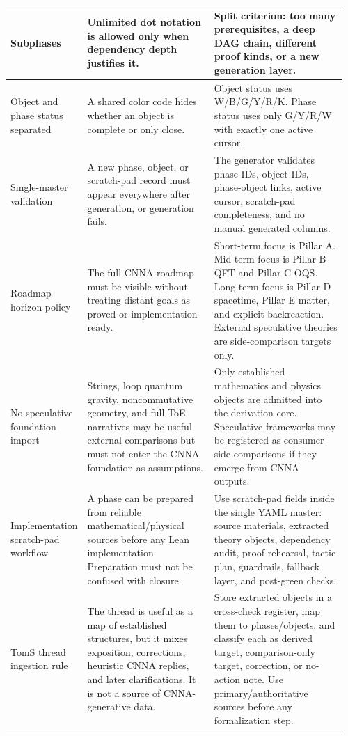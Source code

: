 \begin{longtable}{L{0.18\linewidth} L{0.38\linewidth} L{0.4\linewidth}}
\hline
\addlinespace[0.24em]
Subphases & Unlimited dot notation is allowed only when dependency depth justifies it. & Split criterion: too many prerequisites, a deep DAG chain, different proof kinds, or a new generation layer.\\
\hline
\addlinespace[0.24em]
Object and phase status separated & A shared color code hides whether an object is complete or only close. & Object status uses W/\allowbreak{}B/\allowbreak{}G/\allowbreak{}Y/\allowbreak{}R/\allowbreak{}K. Phase status uses only G/\allowbreak{}Y/\allowbreak{}R/\allowbreak{}W with exactly one active cursor.\\
\hline
\addlinespace[0.24em]
Single-master validation & A new phase, object, or scratch-pad record must appear everywhere after generation, or generation fails. & The generator validates phase IDs, object IDs, phase-object links, active cursor, scratch-pad completeness, and no manual generated columns.\\
\hline
\addlinespace[0.24em]
Roadmap horizon policy & The full CNNA roadmap must be visible without treating distant goals as proved or implementation-ready. & Short-term focus is Pillar A. Mid-term focus is Pillar B QFT and Pillar C OQS. Long-term focus is Pillar D spacetime, Pillar E matter, and explicit backreaction. External speculative theories are side-comparison targets only.\\
\hline
\addlinespace[0.24em]
No speculative foundation import & Strings, loop quantum gravity, noncommutative geometry, and full ToE narratives may be useful external comparisons but must not enter the CNNA foundation as assumptions. & Only established mathematics and physics objects are admitted into the derivation core. Speculative frameworks may be registered as consumer-side comparisons if they emerge from CNNA outputs.\\
\hline
\addlinespace[0.24em]
Implementation scratch-pad workflow & A phase can be prepared from reliable mathematical/\allowbreak{}physical sources before any Lean implementation. Preparation must not be confused with closure. & Use scratch-pad fields inside the single YAML master: source materials, extracted theory objects, dependency audit, proof rehearsal, tactic plan, guardrails, fallback layer, and post-green checks.\\
\hline
\addlinespace[0.24em]
TomS thread ingestion rule & The thread is useful as a map of established structures, but it mixes exposition, corrections, heuristic CNNA replies, and later clarifications. It is not a source of CNNA-generative data. & Store extracted objects in a cross-check register, map them to phases/\allowbreak{}objects, and classify each as derived target, comparison-only target, correction, or no-action note. Use primary/\allowbreak{}authoritative sources before any formalization step.\\

\end{longtable}
